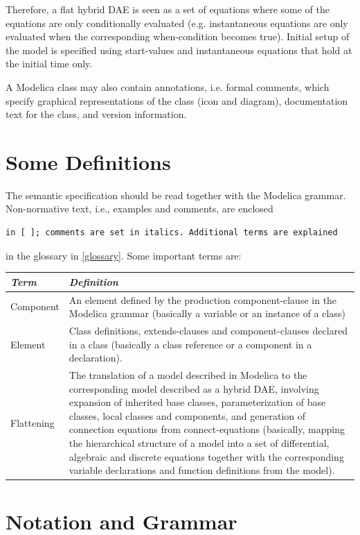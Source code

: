 \documentclass[10pt,a4paper]{report}
\def\doublelabel#1{\label{#1}\hypertarget{#1}{}}
\begin{document}
Therefore, a flat hybrid DAE is seen as a set of equations where some of
the equations are only conditionally evaluated (e.g. instantaneous
equations are only evaluated when the corresponding when-condition
becomes true). Initial setup of the model is specified using
start-values and instantaneous equations that hold at the initial time
only.

A Modelica class may also contain annotations, i.e. formal comments,
which specify graphical representations of the class (icon and diagram),
documentation text for the class, and version information.

\section{Some Definitions}\doublelabel{some-definitions}

The semantic specification should be read together with the Modelica
grammar. Non-normative text, i.e., examples and comments, are enclosed
\begin{lstlisting}[language=modelica]
  in [ ]; comments are set in italics. Additional terms are explained
\end{lstlisting}
in the glossary in \ref{glossary}. Some important terms are:

\begin{tabular}{|l|p{10cm}|}
\hline
\emph{Term} & \emph{Definition} \\
\hline
Component & An element defined by the production
component-clause in the Modelica grammar (basically a
variable or an instance of a class)\\
Element & Class definitions, extends-clauses and
component-clauses declared in a class (basically a class
reference or a component in a declaration).\\
Flattening & The translation of a model described in Modelica to the
corresponding model described as a hybrid DAE, involving expansion of
inherited base classes, parameterization of base classes, local classes
and components, and generation of connection equations from
connect-equations (basically, mapping the hierarchical structure of a
model into a set of differential, algebraic and discrete equations
together with the corresponding variable declarations and function
definitions from the model).\\
\hline
\end{tabular}

\section{Notation and Grammar}\doublelabel{notation-and-grammar}
\end{document}
